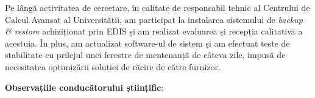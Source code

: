 Pe lângă activitatea de cercetare, în calitate de responsabil tehnic al Centrului de Calcul Avansat al Universității, am participat la instalarea sistemului de \textit{backup \& restore} achiziționat prin EDIS și am realizat evaluarea și recepția calitativă a acestuia. În plus, am actualizat software-ul de sistem și am efectuat teste de stabilitate cu prilejul unei ferestre de mentenanță de câteva zile, impusă de necesitatea optimizării soluției de răcire de către furnizor.

\textbf{Observațiile conducătorului științific}:

